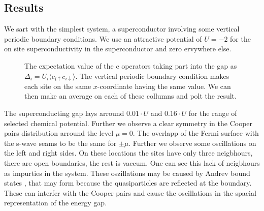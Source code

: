 \documentclass[..\main.tex]{subfile}
\begin{document}
\subsection{Results}
We sart with the simplest system, a superconductor involving some vertical periodic boundary conditions.
We use an attractive potential of $U=-2$ for the on site superconductivity in the superconductor and zero ervywhere else.
\begin{figure}[H]
  \centering
  
  \caption{The expectation value of the c operators taking part into the gap as $\Delta_i = U_i\langle c_{i\uparrow}c_{i\downarrow}\rangle$. The  
  vertical periodic boundary condition makes each site on the same $x$-coordinate having the same value.
    We can then make an average on each of these collumns and polt the result.}
\end{figure}
The superconducting gap lays arround $0.01\cdot U$ and $0.16\cdot U$  for the range of selected chemical potential. Further we observe a 
clear symmetry in the Cooper pairs distribution arround the level $\mu =0$. The overlapp of the Fermi surface with the s-wave seams
to be the same for $\pm\mu$. Further we observe some oscillations on the left and right sides. On these locations the sites have only three
neigbhours, there are open boundaries, the rest is vaccum. One can see this lack of neigbhours as  impurties in the system. 
These oszillations may be caused by Andrev bound states \cite{Bobkov_2024}, that may form because the quasiparticles are reflected at the boundary.
These can interfer with the Cooper pairs and cause the oscillations in the spacial representation of the energy gap.\\
\end{document}
